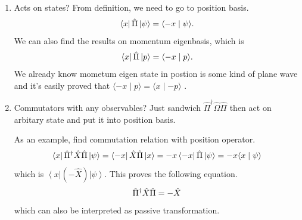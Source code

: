 \documentclass[letterpaper,10pt,english]{sphinxmanual}
\newcommand{\bra}[1]{\left\langle #1\right|}
\newcommand{\ket}[1]{\left| #1\right\rangle}
\newcommand{\braket}[2]{\langle #1 \mid #2 \rangle}
\begin{document}
\begin{enumerate}
\item {} 
Acts on states? From definition, we need to go to position basis.
\begin{gather}
\begin{split}\bra{x}\hat \Pi\ket{\psi}  = \braket{-x}{\psi} .\end{split}\notag
\end{gather}
We can also find the results on momentum eigenbasis, which is
\begin{gather}
\begin{split}\bra{x}\hat \Pi \ket{p} = \braket{-x}{p}   .\end{split}\notag
\end{gather}
We already know mometum eigen state in postion is some kind of plane wave and it's easily proved that \(\braket{-x}{p} = \braket{x}{-p}\) .

\item {} 
Commutators with any observables? Just sandwich \(\hat \Pi^ \dagger \hat \Omega \hat \Pi\) then act on arbitary state and put it into position basis.

As an example, find commutation relation with position operator.
\begin{gather}
\begin{split}\bra{x}\hat \Pi^\dagger \hat X \hat \Pi \ket{\psi} = \bra{ - x}\hat X \hat \Pi\ket{x} = -x \bra{-x}\hat \Pi \ket{\psi} = -x \braket{x}{\psi}\end{split}\notag
\end{gather}
which is \(\bra{x}(-\hat X)\ket{\psi}\). This proves the following equation.
\begin{gather}
\begin{split}\hat \Pi^\dagger \hat X \hat \Pi = -\hat X\end{split}\notag
\end{gather}
which can also be interpreted as passive transformation.


\end{enumerate}
\end{document}
